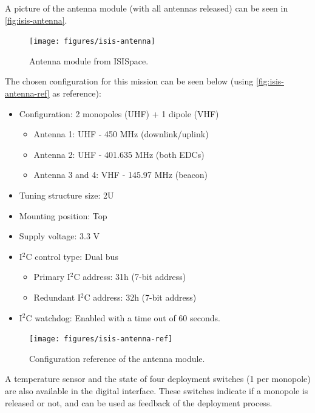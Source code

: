 A picture of the antenna module (with all antennas released) can be seen in \autoref{fig:isis-antenna}.

\begin{figure}[!ht]
    \begin{center}
        \texttt{[image: figures/isis-antenna]}
        \caption{Antenna module from ISISpace.}
        \label{fig:isis-antenna}
    \end{center}
\end{figure}

The chosen configuration for this mission can be seen below (using \autoref{fig:isis-antenna-ref} as reference):

\begin{itemize}
    \item Configuration: 2 monopoles (UHF) + 1 dipole (VHF)
        \begin{itemize}
            \item Antenna 1: UHF - 450 MHz (downlink/uplink)
            \item Antenna 2: UHF - 401.635 MHz (both EDCs)
            \item Antenna 3 and 4: VHF - 145.97 MHz (beacon)
        \end{itemize}
    \item Tuning structure size: 2U
    \item Mounting position: Top
    \item Supply voltage: 3.3 V
    \item I$^{2}$C control type: Dual bus
        \begin{itemize}
            \item Primary I$^{2}$C address: 31h (7-bit address)
            \item Redundant I$^{2}$C address: 32h (7-bit address)
        \end{itemize}
    \item I$^{2}$C watchdog: Enabled with a time out of 60 seconds.
\end{itemize}

\begin{figure}[!ht]
    \begin{center}
        \texttt{[image: figures/isis-antenna-ref]}
        \caption{Configuration reference of the antenna module.}
        \label{fig:isis-antenna-ref}
    \end{center}
\end{figure}

A temperature sensor and the state of four deployment switches (1 per monopole) are also available in the digital interface. These switches indicate if a monopole is released or not, and can be used as feedback of the deployment process.

